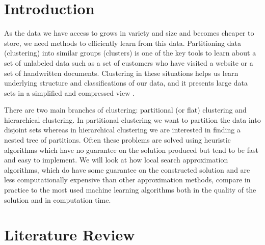 \documentclass{article}
\begin{document}
 



\section{Introduction}
As the data we have access to grows in variety and size and becomes cheaper to store, we need methods to efficiently learn from this data. 
Partitioning data (clustering) into similar groups (clusters) is one of the key tools to learn about a set of unlabeled data such as a set of customers who have visited a website or a set of handwritten documents.
Clustering in these situations helps us learn underlying structure and classifications of our data, and it presents large data sets in a simplified and compressed view \cite{Jain}.

There are two main branches of clustering: partitional (or flat) clustering and hierarchical clustering. In partitional clustering we want to partition the data into disjoint sets whereas in hierarchical clustering we are interested in finding a nested tree of partitions. Often these problems are solved using heuristic algorithms which have no guarantee on the solution produced but tend to be fast and easy to implement. We will look at how local search approximation algorithms, which do have some guarantee on the constructed solution and are less computationally expensive than other approximation methods, compare in practice to the most used machine learning algorithms both in the quality of the solution and in computation time. 

\section{Literature Review}
\end{document}
